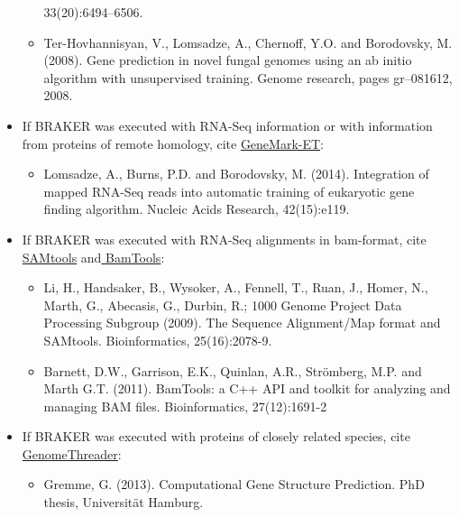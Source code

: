 \documentclass[a4paper,10pt]{report}
\begin{document}
\begin{itemize}
\begin{itemize}
		33(20):6494–6506.
		\item Ter-Hovhannisyan, V., Lomsadze, A., Chernoff, Y.O. and Borodovsky, M. (2008). 
		Gene prediction in novel fungal genomes using an ab initio algorithm with unsupervised
		training. Genome research, pages gr–081612, 2008.
	\end{itemize}
    \item If BRAKER was executed with RNA-Seq information or with information from proteins of remote homology, cite \underline{GeneMark-ET}:
\begin{itemize}
	\item Lomsadze, A., Burns, P.D. and Borodovsky, M. (2014). Integration of mapped RNA-Seq reads into automatic training of eukaryotic gene finding algorithm. Nucleic Acids Research, 42(15):e119.
\end{itemize}
    \item If BRAKER was executed with RNA-Seq alignments in bam-format, cite \underline{SAMtools} and\underline{ BamTools}:
    \begin{itemize}
    	\item Li, H., Handsaker, B., Wysoker, A., Fennell, T., Ruan, J., Homer, N., Marth, G., Abecasis, G., Durbin, R.; 1000 Genome Project Data Processing Subgroup (2009). The Sequence Alignment/Map format and SAMtools. Bioinformatics, 25(16):2078-9.
    	\item Barnett, D.W., Garrison, E.K., Quinlan, A.R., Str\"{o}mberg, M.P. and Marth G.T. (2011). BamTools: a C++ API and toolkit for analyzing and managing BAM files. Bioinformatics, 27(12):1691-2
    \end{itemize}
	\item If BRAKER was executed with proteins of closely related species, cite \underline{GenomeThreader}: 
	\begin{itemize}
		\item Gremme, G. (2013). Computational Gene Structure Prediction. PhD thesis, Universit\"{a}t Hamburg.
	\end{itemize}
\end{itemize}



\end{document}

